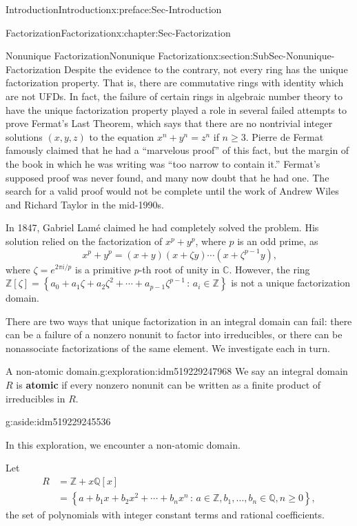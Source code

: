 \documentclass[oneside,10pt,]{book}
\newcommand{\terminology}[1]{\textbf{#1}}
\numberwithin{equation}{section}
\renewcommand{\ge}{\geqslant}
\newcommand{\setof}[2]{{\left\{#1\,\colon\,#2\right\}}}
\def\C{{\mathbb C}}
\def\Z{{\mathbb Z}}
\def\Q{{\mathbb Q}}
\newcommand{\amp}{&}
\begin{document}
\begin{preface}{Introduction}{}{Introduction}{}{}{x:preface:Sec-Introduction}
\begin{chapterptx}{Factorization}{}{Factorization}{}{}{x:chapter:Sec-Factorization}
\begin{sectionptx}{Nonunique Factorization}{}{Nonunique Factorization}{}{}{x:section:SubSec-Nonunique-Factorization}
Despite the evidence to the contrary, not every ring has the unique factorization property. That is, there are commutative rings with identity which are not UFDs.  In fact, the failure of certain rings in algebraic number theory to have the unique factorization property played a role in several failed attempts to prove Fermat's Last Theorem, which says that there are no nontrivial integer solutions \((x,y,z)\) to the equation \(x^n + y^n = z^n\) if \(n \ge 3\). Pierre de Fermat famously claimed that he had a ``marvelous proof'' of this fact, but the margin of the book in which he was writing was ``too narrow to contain it.'' Fermat's supposed proof was never found, and many now doubt that he had one. The search for a valid proof would not be complete until the work of Andrew Wiles and Richard Taylor in the mid-1990s.%
\par
In 1847, Gabriel Lamé claimed he had completely solved the problem. His solution relied on the factorization of \(x^p + y^p\), where \(p\) is an odd prime, as%
\begin{equation*}
x^p + y^p = (x+y)(x+\zeta y) \cdots (x+\zeta^{p-1}y)\text{,}
\end{equation*}
where \(\zeta = e^{2\pi i/p}\) is a primitive \(p\)-th root of unity in \(\C\). However, the ring \(\Z[\zeta] = \setof{a_0 + a_1 \zeta + a_2 \zeta^2 + \cdots + a_{p-1} \zeta^{p-1}}{a_i\in\Z}\) is not a unique factorization domain.%
\par
There are two ways that unique factorization in an integral domain can fail: there can be a failure of a nonzero nonunit to factor into irreducibles, or there can be nonassociate factorizations of the same element. We investigate each in turn.%
\begin{exploration}{A non-atomic domain.}{g:exploration:idm519229247968}%
We say an integral domain \(R\) is \terminology{atomic} if every nonzero nonunit can be written as a finite product of irreducibles in \(R\). \begin{aside}{}{g:aside:idm519229245536}%
\end{aside}
 In this exploration, we encounter a non-atomic domain.%
\par
Let%
\begin{align*}
R \amp = \Z + x\Q[x]\\
\amp = \setof{a + b_1 x + b_2 x^2 + \cdots + b_n x^n}{a\in \Z, b_1,\ldots, b_n \in \Q, n\ge 0},
\end{align*}
the set of polynomials with integer constant terms and rational coefficients.%
%
\begin{enumerate}

\end{enumerate}
\end{exploration}
\end{sectionptx}
\end{chapterptx}
\end{preface}
\end{document}
